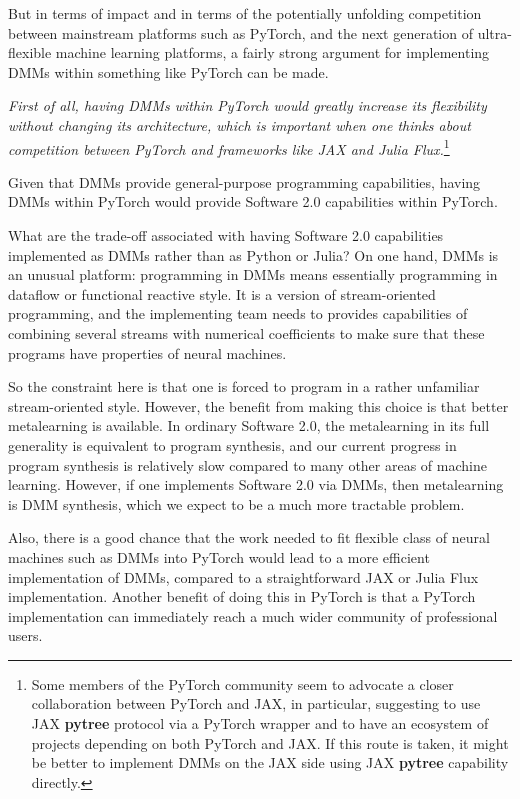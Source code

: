 \documentclass{article}
\begin{document}
But in terms of impact and in terms of the potentially unfolding competition between mainstream platforms such as PyTorch, 
and the next generation of ultra-flexible machine learning platforms, a fairly strong argument for implementing DMMs
within something like PyTorch can be made. 

{\em First of all, having DMMs within PyTorch would greatly increase its flexibility without changing its architecture, 
which is important when one thinks about competition between PyTorch and frameworks like JAX and Julia Flux.}\footnote{Some members of the PyTorch community seem to advocate a closer collaboration between PyTorch and JAX, in particular, 
suggesting to use JAX {\bf pytree} protocol via a PyTorch wrapper and to have an ecosystem of 
projects depending on both PyTorch and JAX. If this route is taken, it might be better to implement DMMs on the JAX side
using JAX {\bf pytree} capability directly.}

Given that DMMs provide general-purpose programming capabilities, having DMMs within PyTorch would provide
Software 2.0 capabilities within PyTorch.

What are the trade-off associated with having Software 2.0 capabilities implemented as DMMs rather
than as Python or Julia? On one hand, DMMs is an unusual platform: programming in DMMs
means essentially programming in dataflow or functional reactive style. It is a version of
stream-oriented programming, and the implementing team needs to provides capabilities of combining several streams with
numerical coefficients to make sure that these programs have properties of neural machines.

So the constraint here is that one is forced to program in a rather unfamiliar stream-oriented style.
However, the benefit from making this choice is that better metalearning is available. In ordinary Software 2.0,
the metalearning in its full generality is equivalent to program synthesis, and our current progress in
program synthesis is relatively slow compared to many other areas of machine learning.
However, if one implements Software 2.0 via DMMs, then metalearning is DMM synthesis,
which we expect to be a much more tractable problem.

Also, there is a good chance that the work needed to fit flexible class of neural machines such as DMMs
into PyTorch would lead to a more efficient implementation of DMMs, compared to a straightforward
JAX or Julia Flux implementation. Another benefit of doing this in PyTorch  is that a PyTorch
implementation can immediately reach a much wider community of professional users.
\end{document}
